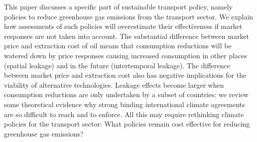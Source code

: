 This paper discusses a specific part of sustainable transport policy, namely policies to reduce greenhouse gas emissions from the transport sector. We explain how assessments of such policies will overestimate their effectiveness if market responses are not taken into account. The substantial difference between market price and extraction cost of oil means that consumption reductions will be watered down by price responses causing increased consumption in other places (spatial leakage) and in the future (intertemporal leakage). The difference between market price and extraction cost also has negative implications for the viability of alternative technologies. Leakage effects become larger when consumption reductions are only undertaken by a subset of countries: we review some theoretical evidence why strong binding international climate agreements are so difficult to reach and to enforce. All this may require rethinking climate policies for the transport sector: What policies remain cost effective for reducing greenhouse gas emissions?